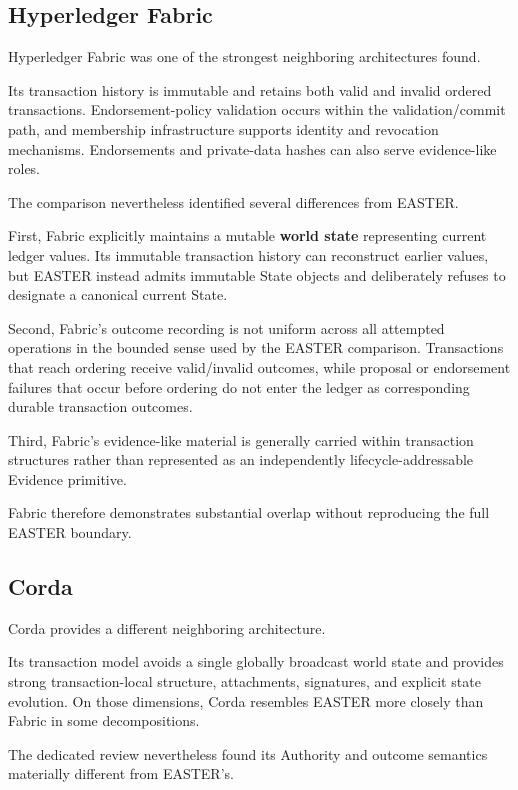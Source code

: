 \documentclass[11pt]{article}
\begin{document}
\subsection{Hyperledger Fabric}

Hyperledger Fabric was one of the strongest neighboring architectures found.

Its transaction history is immutable and retains both valid and invalid ordered transactions. Endorsement-policy validation occurs within the validation/commit path, and membership infrastructure supports identity and revocation mechanisms. Endorsements and private-data hashes can also serve evidence-like roles.

The comparison nevertheless identified several differences from EASTER.

First, Fabric explicitly maintains a mutable \textbf{world state} representing current ledger values. Its immutable transaction history can reconstruct earlier values, but EASTER instead admits immutable State objects and deliberately refuses to designate a canonical current State.

Second, Fabric's outcome recording is not uniform across all attempted operations in the bounded sense used by the EASTER comparison. Transactions that reach ordering receive valid/invalid outcomes, while proposal or endorsement failures that occur before ordering do not enter the ledger as corresponding durable transaction outcomes.

Third, Fabric's evidence-like material is generally carried within transaction structures rather than represented as an independently lifecycle-addressable Evidence primitive.

Fabric therefore demonstrates substantial overlap without reproducing the full EASTER boundary.

\subsection{Corda}

Corda provides a different neighboring architecture.

Its transaction model avoids a single globally broadcast world state and provides strong transaction-local structure, attachments, signatures, and explicit state evolution. On those dimensions, Corda resembles EASTER more closely than Fabric in some decompositions.

The dedicated review nevertheless found its Authority and outcome semantics materially different from EASTER's.
\end{document}
